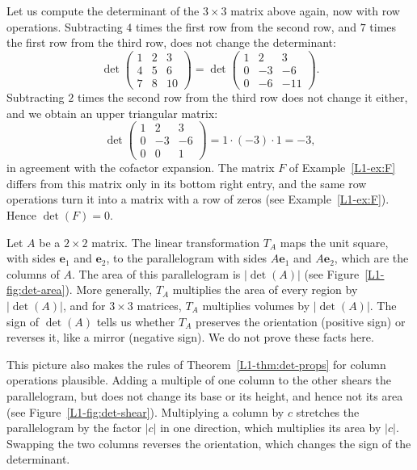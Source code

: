 \begin{example}
    Let us compute the determinant of the $3 \times 3$ matrix above again, now with row operations. Subtracting $4$ times the first row from the second row, and $7$ times the first row from the third row, does not change the determinant:
    \[\det \begin{pmatrix}
        1 & 2 & 3 \\
        4 & 5 & 6 \\
        7 & 8 & 10
    \end{pmatrix} = \det \begin{pmatrix}
        1 & 2 & 3 \\
        0 & -3 & -6 \\
        0 & -6 & -11
    \end{pmatrix}.\]
    Subtracting $2$ times the second row from the third row does not change it either, and we obtain an upper triangular matrix:
    \[\det \begin{pmatrix}
        1 & 2 & 3 \\
        0 & -3 & -6 \\
        0 & 0 & 1
    \end{pmatrix} = 1 \cdot (-3) \cdot 1 = -3,\]
    in agreement with the cofactor expansion. The matrix $F$ of Example~\ref{L1-ex:F} differs from this matrix only in its bottom right entry, and the same row operations turn it into a matrix with a row of zeros (see Example~\ref{L1-ex:F}). Hence $\det(F) = 0$.
\end{example}

\begin{remark}
    Let $A$ be a $2 \times 2$ matrix. The linear transformation $T_A$ maps the unit square, with sides $\mathbf{e}_1$ and $\mathbf{e}_2$, to the parallelogram with sides $A\mathbf{e}_1$ and $A\mathbf{e}_2$, which are the columns of $A$. The area of this parallelogram is $|\det(A)|$ (see Figure~\ref{L1-fig:det-area}). More generally, $T_A$ multiplies the area of every region by $|\det(A)|$, and for $3 \times 3$ matrices, $T_A$ multiplies volumes by $|\det(A)|$. The sign of $\det(A)$ tells us whether $T_A$ preserves the orientation (positive sign) or reverses it, like a mirror (negative sign). We do not prove these facts here.

    This picture also makes the rules of Theorem~\ref{L1-thm:det-props} for column operations plausible. Adding a multiple of one column to the other shears the parallelogram, but does not change its base or its height, and hence not its area (see Figure~\ref{L1-fig:det-shear}). Multiplying a column by $c$ stretches the parallelogram by the factor $|c|$ in one direction, which multiplies its area by $|c|$. Swapping the two columns reverses the orientation, which changes the sign of the determinant.
\end{remark}

